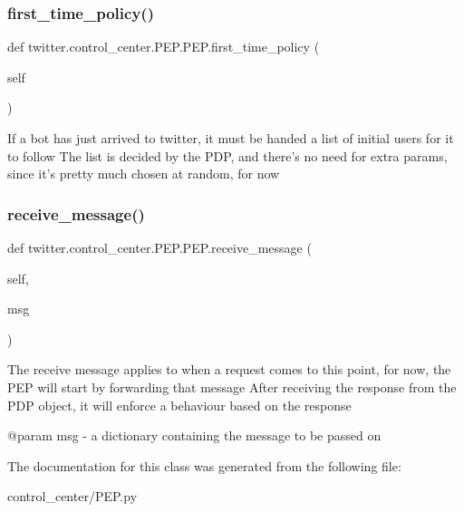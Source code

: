 \subsubsection{\texorpdfstring{first\+\_\+time\+\_\+policy()}{first\_time\_policy()}}
{\footnotesize\ttfamily def twitter.\+control\+\_\+center.\+P\+E\+P.\+P\+E\+P.\+first\+\_\+time\+\_\+policy (\begin{DoxyParamCaption}\item[{}]{self }\end{DoxyParamCaption})}

\begin{DoxyVerb}If a bot has just arrived to twitter, it must be handed a list of initial users for it to follow
The list is decided by the PDP, and there's no need for extra params, since it's pretty much chosen at random, for now
\end{DoxyVerb}
 \mbox{\label{classtwitter_1_1control__center_1_1PEP_1_1PEP_a77d6cfa9b9fed7164b8c370b7147922f}} 
\subsubsection{\texorpdfstring{receive\+\_\+message()}{receive\_message()}}
{\footnotesize\ttfamily def twitter.\+control\+\_\+center.\+P\+E\+P.\+P\+E\+P.\+receive\+\_\+message (\begin{DoxyParamCaption}\item[{}]{self,  }\item[{}]{msg }\end{DoxyParamCaption})}

\begin{DoxyVerb}The receive message applies to when a request comes to this point, for now, the PEP will start by forwarding that message
After receiving the response from the PDP object, it will enforce a behaviour based on the response

@param msg - a dictionary containing the message to be passed on
\end{DoxyVerb}
 

The documentation for this class was generated from the following file\+:\begin{DoxyCompactItemize}
\item 
control\+\_\+center/P\+E\+P.\+py\end{DoxyCompactItemize}
